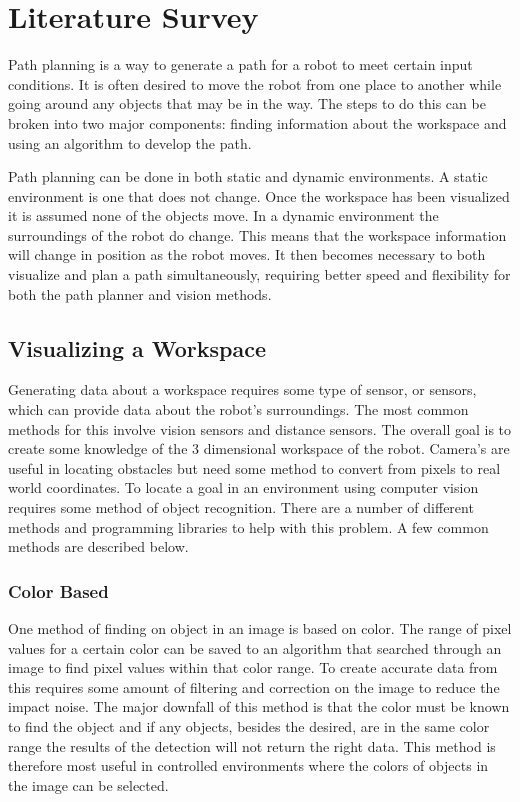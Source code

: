 \chapter{Literature Survey}

Path planning is a way to generate a path for a robot to meet certain input conditions. It is often desired to move the robot from one place to another while going around any objects that may be in the way. The steps to do this can be broken into two major components: finding information about the workspace and using an algorithm to develop the path. 

Path planning can be done in both static and dynamic environments. A static environment is one that does not change. Once the workspace has been visualized it is assumed none of the objects move. In a dynamic environment the surroundings of the robot do change. This means that the workspace information will change in position as the robot moves. It then becomes necessary to both visualize and plan a path simultaneously, requiring better speed and flexibility for both the path planner and vision methods.

\section{Visualizing a Workspace}
Generating data about a workspace requires some type of sensor, or sensors, which can provide data about the robot's surroundings. The most common methods for this involve vision sensors and distance sensors. The overall goal is to create some knowledge of the 3 dimensional workspace of the robot. Camera's are useful in locating obstacles but need some method to convert from pixels to real world coordinates. To locate a goal in an environment using computer vision requires some method of object recognition. There are a number of different methods and programming libraries to help with this problem. A few common methods are described below.

\subsection{Color Based}  
One method of finding on object in an image is based on color. The range of pixel values for a certain color can be saved to an algorithm that searched through an image to find pixel values within that color range. To create accurate data from this requires some amount of filtering and correction on the image to reduce the impact noise. The major downfall of this method is that the color must be known to find the object and if any objects, besides the desired, are in the same color range the results of the detection will not return the right data. This method is therefore most useful in controlled environments where the colors of objects in the image can be selected.


